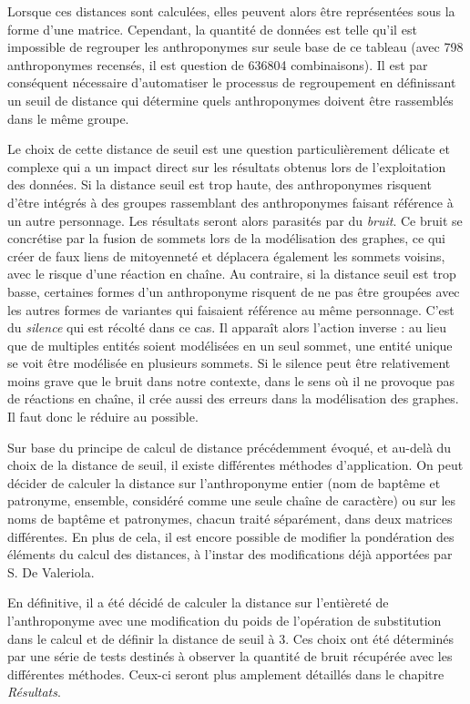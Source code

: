 Lorsque ces distances sont calculées, elles peuvent alors être représentées sous la forme d'une matrice. Cependant, la quantité de données  est telle qu'il est impossible de regrouper les anthroponymes sur seule base de ce tableau (avec 798 anthroponymes recensés, il est question de 636804 combinaisons). Il est par conséquent nécessaire d'automatiser le processus de regroupement en définissant  un seuil de distance qui détermine quels  anthroponymes doivent être rassemblés dans le même groupe. 

Le choix de cette distance de seuil est une question particulièrement délicate et complexe qui a un impact  direct sur les résultats obtenus lors de l'exploitation des données. Si la distance seuil est trop haute, des anthroponymes risquent d'être intégrés à des groupes rassemblant des anthroponymes faisant référence à un autre personnage. Les résultats seront alors parasités par du \textit{bruit}. Ce bruit se concrétise par la fusion de sommets lors de la modélisation des graphes, ce qui créer de faux liens de mitoyenneté et déplacera également les sommets voisins, avec le risque d'une réaction en chaîne.
Au contraire, si la distance seuil est trop basse, certaines formes d'un anthroponyme risquent de ne pas être groupées avec les autres formes de variantes qui faisaient référence au même personnage. C'est du \textit{silence} qui est récolté dans ce cas. Il apparaît alors l'action inverse : au lieu que de multiples entités soient modélisées en un seul sommet, une entité unique se voit être modélisée en plusieurs sommets. Si le silence peut être relativement moins grave que le bruit dans notre contexte, dans le sens où il ne provoque pas de réactions en chaîne, il crée aussi des erreurs dans la modélisation des graphes. Il faut donc le réduire au possible.

Sur base du principe de calcul de distance précédemment évoqué, et au-delà du choix de la distance de seuil, il existe différentes méthodes d'application. On peut décider de calculer la distance sur l'anthroponyme entier (nom de baptême et patronyme, ensemble, considéré comme une seule chaîne de caractère) ou sur les noms de baptême  et patronymes, chacun traité séparément, dans deux matrices différentes. En plus de cela, il est encore possible de modifier la pondération des éléments du  calcul des distances, à l'instar des modifications déjà apportées par S. De Valeriola.

En définitive, il a été décidé de calculer la distance sur l'entièreté de l'anthroponyme avec  une modification du poids de l'opération de substitution dans le calcul et de définir la distance de seuil à 3. 
Ces choix ont été déterminés par une série de tests destinés à observer la quantité de bruit récupérée avec les différentes méthodes. Ceux-ci seront plus amplement détaillés dans le chapitre \textit{Résultats}.

